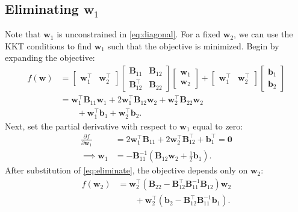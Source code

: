 \documentclass[journal,twoside]{IEEEtran}
\renewcommand{\vec}[1]{\mathbf{#1}}
\begin{document}
\subsection{Eliminating $\vec{w}_1$}\label{sec:solution-eliminate}
Note that $\vec{w}_1$ is unconstrained in \eqref{eq:diagonal}. For a fixed $\vec{w}_2$, we can use the KKT
conditions to find $\vec{w}_1$ such that the objective is minimized. Begin by
expanding the objective:
\begin{align*}
f(\vec{w}) &=
\begin{bmatrix} \vec{w}_1^\top & \vec{w}_2^\top \end{bmatrix}
\begin{bmatrix} \mathbf{B}_{11} & \mathbf{B}_{12} \\ \mathbf{B}_{12}^\top & \mathbf{B}_{22}\end{bmatrix}
\begin{bmatrix} \vec{w}_1 \\ \vec{w}_2 \end{bmatrix} +
\begin{bmatrix} \vec{w}_1^\top & \vec{w}_2^\top \end{bmatrix}
\begin{bmatrix} \vec{b}_1 \\ \vec{b}_2\end{bmatrix} \\
&=
\vec{w}_1^\top \mathbf{B}_{11}\vec{w}_1 + 2\vec{w}_1^\top \mathbf{B}_{12}\vec{w}_2 + \vec{w}_2^\top \mathbf{B}_{22}\vec{w}_2 \\
&\qquad + \vec{w}_1^\top \vec{b}_1 + \vec{w}_2^\top \vec{b}_2.
\end{align*}
Next, set the partial derivative with respect to $\vec{w}_1$ equal to zero:
\begin{align}
\nonumber \frac{\partial f}{\partial \vec{w}_1} &= 2\vec{w}_1^\top \mathbf{B}_{11} + 2\vec{w}_2^\top \mathbf{B}_{12}^\top + \vec{b}_1^\top = \vec{0} \\
\label{eq:eliminate} \implies \vec{w}_1 &= -\mathbf{B}_{11}^{-1}\left(\mathbf{B}_{12}\vec{w}_2 +
\frac{1}{2}\vec{b}_1 \right).
\end{align}
After substitution of \eqref{eq:eliminate}, the objective depends only on $\vec{w}_2$:
\begin{align*}
f(\vec{w}_2) &= \vec{w}_2^\top\left(\mathbf{B}_{22} - \mathbf{B}_{12}^\top \mathbf{B}_{11}^{-1}
\mathbf{B}_{12}\right)\vec{w}_2 \\
&\qquad + \vec{w}_2^\top (\vec{b}_2 - \mathbf{B}_{12}^\top \mathbf{B}_{11}^{-1}\vec{b}_1).
\end{align*}
\end{document}
